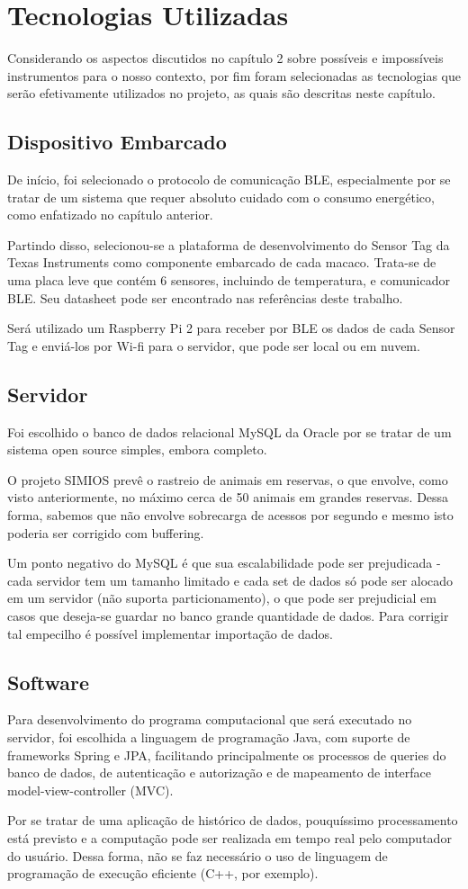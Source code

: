 \chapter{Tecnologias Utilizadas}
Considerando os aspectos discutidos no capítulo 2 sobre possíveis e impossíveis instrumentos para o nosso contexto, por fim foram selecionadas as tecnologias que serão efetivamente utilizados no projeto, as quais são descritas neste capítulo.

\section{Dispositivo Embarcado}
De início, foi selecionado o protocolo de comunicação BLE, especialmente por se tratar de um sistema que requer absoluto cuidado com o consumo energético, como enfatizado no capítulo anterior.

Partindo disso, selecionou-se a plataforma de desenvolvimento do Sensor Tag da Texas Instruments como componente embarcado de cada macaco. Trata-se de uma placa leve que contém 6 sensores, incluindo de temperatura, e comunicador BLE. Seu datasheet pode ser encontrado nas referências deste trabalho.

Será utilizado um Raspberry Pi 2 para receber por BLE os dados de cada Sensor Tag e enviá-los por Wi-fi para o servidor, que pode ser local ou em nuvem. 

\section{Servidor}
Foi escolhido o banco de dados relacional MySQL da Oracle por se tratar de um sistema open source simples, embora completo.

O projeto SIMIOS prevê o rastreio de animais em reservas, o que envolve, como visto anteriormente, no máximo cerca de 50 animais em grandes reservas. Dessa forma, sabemos que não envolve sobrecarga de acessos por segundo e mesmo isto poderia ser corrigido com buffering.

Um ponto negativo do MySQL é que sua escalabilidade pode ser prejudicada - cada servidor tem um tamanho limitado e cada set de dados só pode ser alocado em um servidor (não suporta particionamento), o que pode ser prejudicial em casos que deseja-se guardar no banco grande quantidade de dados. Para corrigir tal empecilho é possível implementar importação de dados.

\section{Software}
Para desenvolvimento do programa computacional que será executado no servidor, foi escolhida a linguagem de programação Java, com suporte de frameworks Spring e JPA, facilitando principalmente os processos de queries do banco de dados, de autenticação e autorização e de mapeamento de interface model-view-controller (MVC).

Por se tratar de uma aplicação de histórico de dados, pouquíssimo processamento está previsto e a computação pode ser realizada em tempo real pelo computador do usuário. Dessa forma, não se faz necessário o uso de linguagem de programação de execução eficiente (C++, por exemplo).
